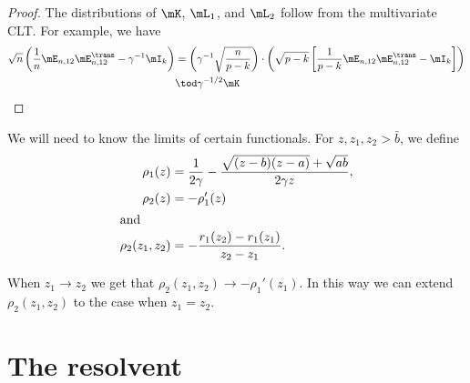 \begin{proof}
    The distributions of $\mK$, $\mL_1$, and $\mL_2$ follow from the 
    multivariate CLT.  For 
    example, we have
    \begin{align*}
        \sqrt{n}
        \left(
            \frac{1}{n} \mE_{n,12} \mE_{n,12}^\trans
            -
            \gamma^{-1}
            \mI_k
        \right)
            &=
                \left(
                    \gamma^{-1}
                    \sqrt{ \frac{ n }{ p - k } }
                \right)
                \cdot
                \left(
                    \sqrt{ p - k }
                    \left[
                        \frac{1}{p-k}
                        \mE_{n,12} \mE_{n,12}^\trans
                        -
                        \mI_k
                    \right]
                \right) \\
            &\tod
                \gamma^{-1/2}
                \mK
    \end{align*}
\end{proof}

\clearpage




We will need to know the limits of certain functionals.  For
$z, z_1, z_2 > \bar b$, we define
\begin{align*}
    \rho_1(z)
        &=
        \frac{1}{2 \gamma}
        -
        \frac{\sqrt{(z - b)(z - a)} + \sqrt{ a b}}
             {2 \gamma z}, \\
    \rho_2(z)
        &= -\rho_{1}'(z) \\
\intertext{and}
    \rho_2(z_1, z_2)
        &= - \frac{r_1(z_2) - r_1(z_1)}{z_2 - z_1}.
\end{align*}

\noindent
When $z_1 \to z_2$ we get that $\rho_2 (z_1, z_2) \to - \rho_1'(z_1)$.  In this way we can extend $\rho_2 (z_1, z_2)$ to the case when $z_1 = z_2$.

\section{The resolvent}\label{S:resolvent}


